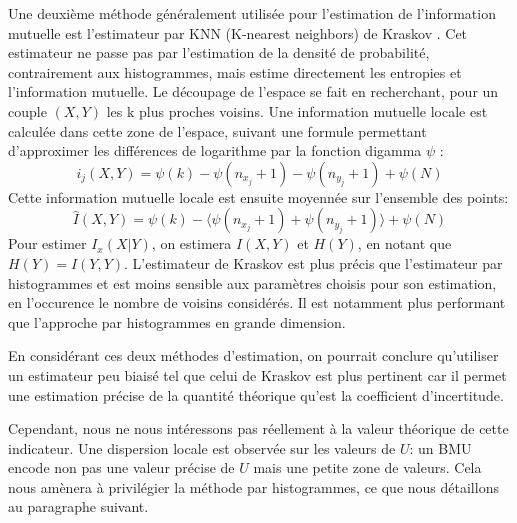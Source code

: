 \documentclass[../main]{subfiles}
\begin{document}
Une deuxième méthode généralement utilisée pour l'estimation de l'information mutuelle est l'estimateur par KNN (K-nearest neighbors) de Kraskov \cite{2004kraskov}. 
Cet estimateur ne passe pas par l'estimation de la densité de probabilité, contrairement aux histogrammes, mais estime directement les entropies et l'information mutuelle.
Le découpage de l'espace se fait en recherchant, pour un couple $(X,Y)$ les k plus proches voisins. Une information mutuelle locale est calculée dans cette zone de l'espace, suivant une formule permettant d'approximer les différences de logarithme par la fonction digamma $\psi$ : 
$$i_j(X,Y) = \psi(k) - \psi(n_{x_j} + 1) - \psi(n_{y_j} +1) + \psi(N)$$
Cette information mutuelle locale est ensuite moyennée sur l'ensemble des points: 
$$\hat{I}(X,Y) = \psi(k) - \langle\psi(n_{x_j} + 1) + \psi(n_{y_j} +1)\rangle + \psi(N)$$
Pour estimer $I_x(X|Y)$, on estimera $I(X,Y)$ et $H(Y)$, en notant que $H(Y) = I(Y,Y)$.
L'estimateur de Kraskov est plus précis que l'estimateur par histogrammes et est moins sensible aux paramètres choisis pour son estimation, en l'occurence le nombre de voisins considérés. Il est notamment plus performant que l'approche par histogrammes en grande dimension.

En considérant ces deux méthodes d'estimation, on pourrait conclure qu'utiliser un estimateur peu biaisé tel que celui de Kraskov est plus pertinent car il permet une estimation précise de la quantité théorique qu'est la coefficient d'incertitude.

Cependant, nous ne nous intéressons pas réellement à la valeur théorique de cette indicateur. Une dispersion locale est observée sur les valeurs de $U$: un BMU encode non pas une valeur précise de $U$ mais une petite zone de valeurs. Cela nous amènera à privilégier la méthode par histogrammes, ce que nous détaillons au paragraphe suivant.
\end{document}
